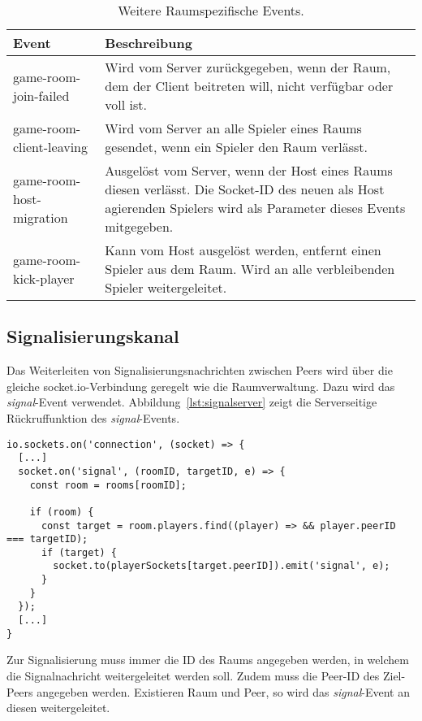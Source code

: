 \begin{table}[ht]
\centering
\begin{tabularx}{\textwidth}{lX}
\toprule
Event&Beschreibung\\

\midrule
game-room-join-failed&Wird vom Server zurückgegeben, wenn der Raum, dem der Client beitreten will, nicht verfügbar oder voll ist.\\
game-room-client-leaving&Wird vom Server an alle Spieler eines Raums gesendet, wenn ein Spieler den Raum verlässt.\\
game-room-host-migration&Ausgelöst vom Server, wenn der Host eines Raums diesen verlässt. Die Socket-ID des neuen als Host agierenden Spielers wird als Parameter dieses Events mitgegeben.\\
game-room-kick-player&Kann vom Host ausgelöst werden, entfernt einen Spieler aus dem Raum. Wird an alle verbleibenden Spieler weitergeleitet.\\
\bottomrule

\end{tabularx}
\caption{Weitere Raumspezifische Events.}
\label{table:otherevents}
\end{table}

\subsection{Signalisierungskanal}
\label{section:signalisierungskanal}
Das Weiterleiten von Signalisierungsnachrichten zwischen Peers wird über die gleiche socket.io-Verbindung geregelt wie die Raumverwaltung. Dazu wird das \textit{signal}-Event verwendet. Abbildung~\ref{lst:signalserver} zeigt die Serverseitige Rückruffunktion des \textit{signal}-Events.

\vspace{6pt}
\lstset{language=js, style=STYLE_CODE_JS}
\begin{singlespace}
\begin{minipage}{\textwidth}
\begin{lstlisting}[caption={Event zum Weiterleiten eines Signals -- Server.js}, captionpos=b, label={lst:signalserver}]
io.sockets.on('connection', (socket) => {
  [...]
  socket.on('signal', (roomID, targetID, e) => {
    const room = rooms[roomID];

    if (room) {
      const target = room.players.find((player) => && player.peerID === targetID);
      if (target) {
        socket.to(playerSockets[target.peerID]).emit('signal', e);
      }
    }
  });
  [...]
}
\end{lstlisting}
\end{minipage}
\end{singlespace}
\newpage
Zur Signalisierung muss immer die ID des Raums angegeben werden, in welchem die Signalnachricht weitergeleitet werden soll. Zudem muss die Peer-ID des Ziel-Peers angegeben werden. Existieren Raum und Peer, so wird das \textit{signal}-Event an diesen weitergeleitet.

